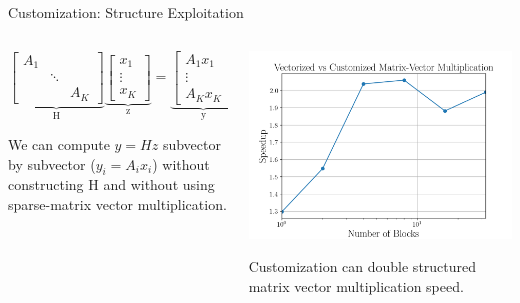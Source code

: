 \documentclass[aspectratio=169]{beamer}
\begin{document}
\begin{frame}{Customization: Structure Exploitation}
    \begin{columns}[T]
        \begin{column}{.5\textwidth}
            $\underbrace{\begin{bmatrix}
                A_{1} & & \\
                & \ddots & \\
                & & A_{K}
              \end{bmatrix}}_{\text{H}}
              \underbrace{
              \begin{bmatrix}
                x_{1}\\
                \vdots\\
                x_{K}
              \end{bmatrix}}_{\text{z}} = 
              \underbrace{
              \begin{bmatrix}
                A_{1}x_{1}\\
                \vdots\\
                A_{K}x_{K}
              \end{bmatrix}}_{\text{y}}$

              \vspace{0.5cm}


              We can compute $y=Hz$ subvector by subvector ($y_i = A_ix_i$) without constructing H and without using sparse-matrix vector multiplication.
            \end{column}
        \begin{column}{.5\textwidth}
            \includegraphics[width=\textwidth]{img/customized_speedup.png}

            \vspace{0.5cm}

            \begin{center}
                Customization can double structured matrix vector multiplication speed.
            \end{center}
        \end{column}
    \end{columns}
\end{frame}
\end{document}
